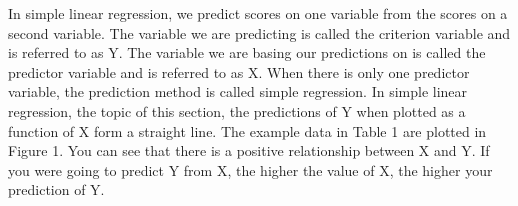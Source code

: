 In simple linear regression, we predict scores on one variable from the scores on a second variable. The variable we are predicting is called the criterion variable and is referred to as Y. The variable we are basing our predictions on is called the predictor variable and is referred to as X. When there is only one predictor variable, the prediction method is called simple regression. In simple linear regression, the topic of this section, the predictions of Y when plotted as a function of X form a straight line.
The example data in Table 1 are plotted in Figure 1. You can see that there is a positive relationship between X and Y. If you were going to predict Y from X, the higher the value of X, the higher your prediction of Y.
